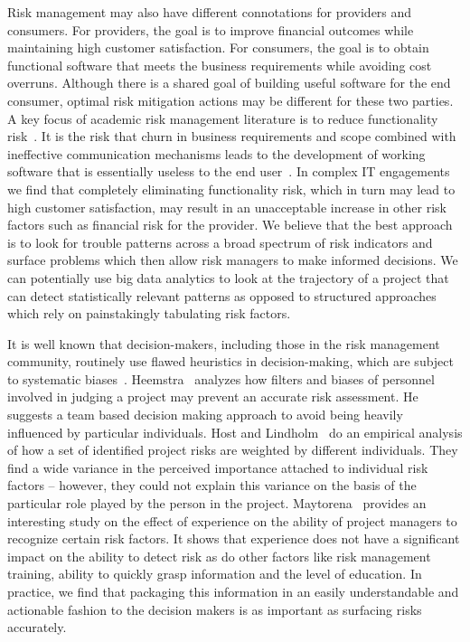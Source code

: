 Risk management may also have different connotations for providers and consumers. For providers, the goal is to improve financial outcomes while maintaining high customer satisfaction. For consumers, the goal is to obtain functional software that meets the business requirements while avoiding cost overruns. Although there is a shared goal of building useful software for the end consumer, optimal risk mitigation actions may be different for these two parties. A key focus of academic risk management literature is to reduce functionality risk~\cite{risk11}.  It is the risk that churn in business requirements and scope combined with ineffective communication mechanisms leads to the development of working software that is essentially useless to the end user~\cite{risk12}. In complex IT engagements we find that completely eliminating functionality risk, which in turn may lead to high customer satisfaction, may result in an unacceptable increase in other risk factors such as financial risk for the provider. We believe that the best approach is to look for trouble patterns across a broad spectrum of risk indicators and surface problems which then allow risk managers to make informed decisions. We can potentially use big data analytics to look at the trajectory of a project that can detect statistically relevant patterns as opposed to structured approaches which rely on painstakingly tabulating risk factors.

It is well known that decision-makers, including those in the risk management community, routinely use flawed heuristics in decision-making, which are subject to systematic biases~\cite{risk27}. Heemstra~\cite{risk24} analyzes how filters and biases of personnel involved in judging a project may prevent an accurate risk assessment. He suggests a team based decision making approach to avoid being heavily influenced by particular individuals. Host and Lindholm~\cite{risk25}  do an empirical analysis of how a set of identified project risks are weighted by different individuals. They find a wide variance in the perceived importance attached to individual risk factors -- however, they could not explain this variance on the basis of the particular role played by the person in the project. Maytorena~\cite{risk26} provides an interesting study on the effect of experience on the ability of project managers to recognize certain risk factors. It shows that experience does not have a significant impact on the ability to detect risk as do other factors like risk management training, ability to quickly grasp information and the level of education. In practice, we find that packaging this information in an easily understandable and actionable fashion to the decision makers is as important as surfacing risks accurately.


